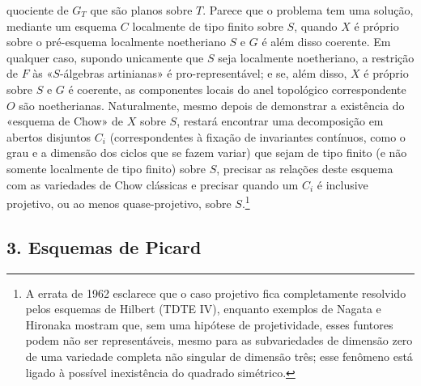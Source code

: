 \documentclass[11pt,twoside,openany]{book}
\numberwithin{equation}{section}
\newcommand{\src}[1]{%
  \phantomsection\hypertarget{src:#1}{}%
  \marginpar{\raggedleft\footnotesize\sffamily #1}%
}
\theoremstyle{plain}
\theoremstyle{definition}
\theoremstyle{remark}
\newcommand{\FgaUnitKey}{frontmatter}
\renewcommand{\src}[1]{%
  \phantomsection\hypertarget{src:\FgaUnitKey:#1}{}%
  \marginpar{\raggedleft\footnotesize\sffamily #1}%
}
\begin{document}
\src{383}
quociente de $G_T$ que são planos sobre $T$. Parece que o problema tem uma
solução, mediante um esquema $C$ localmente de tipo finito sobre $S$, quando
$X$ é próprio sobre o pré-esquema localmente noetheriano $S$ e $G$ é além disso
coerente. Em qualquer caso, supondo unicamente que $S$ seja localmente
noetheriano, a restrição de $F$ às «$S$-álgebras artinianas» é
pro-representável; e se, além disso, $X$ é próprio sobre $S$ e $G$ é coerente, as
componentes locais do anel topológico correspondente $O$ são
noetherianas. Naturalmente, mesmo depois de demonstrar a existência do
«esquema de Chow» de $X$ sobre $S$, restará
encontrar uma decomposição em abertos disjuntos $C_i$ (correspondentes à
fixação de invariantes contínuos, como o grau e a dimensão dos
ciclos que se fazem variar) que sejam de tipo finito (e não somente localmente de
tipo finito) sobre $S$, precisar as relações deste esquema com as
variedades de Chow clássicas e precisar quando um $C_i$ é inclusive projetivo,
ou ao menos quase-projetivo, sobre $S$.\footnote{A errata de 1962
esclarece que o caso projetivo fica completamente resolvido pelos esquemas de
Hilbert (TDTE IV), enquanto exemplos de Nagata e Hironaka mostram que, sem
uma hipótese de projetividade, esses funtores podem não ser representáveis,
mesmo para as subvariedades de dimensão zero de uma variedade completa não
singular de dimensão três; esse fenômeno está ligado à possível
inexistência do quadrado simétrico.}

\subsection*{3. Esquemas de Picard}
\end{document}
